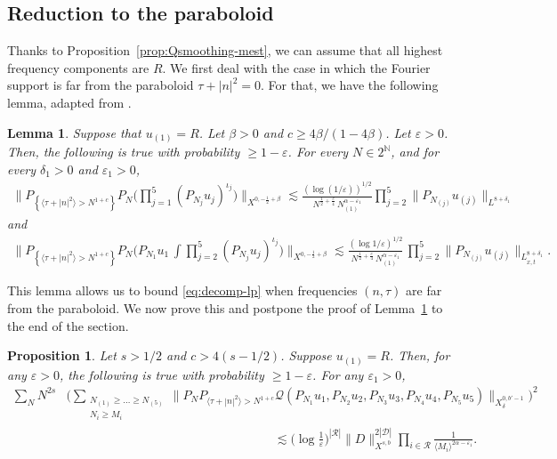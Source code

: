 \documentclass[11pt, xcolor = dvipsnames,reqno
]{amsart}
\newtheorem{prop}[thm]{Proposition}
\newtheorem{lem}[thm]{Lemma}
\theoremstyle{definition}
\theoremstyle{remark}
\begin{document}
\subsection{Reduction to the paraboloid} \label{subsec:red-par} 
Thanks to Proposition~\ref{prop:Qsmoothing-mest}, we can assume that all highest frequency components are $R$. 
%
We first deal with the case in which the Fourier support is far from the paraboloid $\tau + |n|^2 = 0$. 
For that, we have the following lemma, adapted from \cite{CLS2020}. 
\begin{lem}\label{lemma:reduction-2}
Suppose that $u_{(1)} = R$.
Let $\beta > 0$ and $c \geq 4\beta/(1 - 4\beta)$. 
Let $\varepsilon > 0$. 
Then, the following is true with probability $\geq 1 - \varepsilon$. 
For every $N \in 2^{\mathbb N}$, and for every $\delta_1 > 0$ and $\varepsilon_1 > 0$,
\begin{align}
\Big\| 
P_{\left\{ \langle \tau + |n|^2 \rangle > N^{1+c} \right\}} 
P_N  
\Big( 
\prod_{j=1}^5
(P_{N_j} u_j)^{\iota_j}
\Big) 
\Big\|_{X^{0,-\frac{1}{2}+\beta}}
\lesssim 
\frac{(\log (1/\varepsilon))^{1/2}}{N^{\frac{1}{2}+\frac{c}{4}} \, N_{(1)}^{\alpha - \varepsilon_1}} 
\prod_{j=2}^5 \lVert P_{N_{(j)}} u_{(j)} \rVert_{L^{8+\delta_1}}
\end{align}
and 
\begin{align}
    \bigg\| 
    P_{\left\{ \langle \tau + |n|^2 \rangle > N^{1+c} \right\}} 
    P_N  
    \Big( 
    P_{N_1} u_1 \, 
    \int 
    \prod_{j=2}^5
    (P_{N_j} u_j)^{\iota_j}
    \Big) 
    \bigg\|_{X^{0,-\frac{1}{2}+\beta}}
    \lesssim 
    \frac{(\log 1/\varepsilon)^{1/2}}{N^{\frac12 + \frac{c}{4}} \, N_{(1)}^{\alpha - \varepsilon_1}} \, 
    \prod_{j=2}^5
    \lVert P_{N_{(j)}} u_{(j)}
    \rVert_{L^{8+\delta_1}_{x,t}}.
\end{align}
\end{lem}

This lemma allows us to bound \eqref{eq:decomp-lp} when frequencies $(n,\tau)$ are far from the paraboloid.
We now prove this and postpone the proof of Lemma~\ref{lemma:reduction-2} to the end of the section.

\begin{prop}\label{prop:Qsmoothing-par}
    Let $s > 1/2$ and $c > 4(s - 1/2)$.
    Suppose $u_{(1)} = R$. 
    Then, for any $\varepsilon > 0$,
    the following is true with probability $\geq 1 - \varepsilon$. 
    For any $\varepsilon_1 > 0$, 
    \begin{align*}
        \sum_N
    N^{2s} 
    &\Big( 
    \sum_{\substack{N_{(1)} \geq \ldots\geq N_{(5)} \\ N_i \geq M_i  }} \lVert P_N P_{\langle \tau + |n|^2 \rangle > N^{1 + c}} \mathcal{Q}(P_{N_{1}}u_{1}, P_{N_{2}}u_{2}, P_{N_{3}}u_{3}, P_{N_{4}}u_{4}, P_{N_{5}}u_{5}) \rVert_{X^{0,b'-1}_\delta} \Big)^2 \\
    & \hspace{7cm} \lesssim \Big(  \log \frac{1}{\varepsilon} \Big)^{|\mathcal{R}|} \|D\|_{X^{s,b}}^{2|\mathcal{D}|} \prod_{i \in \mathcal{R}} \frac{1}{\langle M_i \rangle^{2\alpha - \varepsilon_1}}.
    \end{align*}
\end{prop}
\end{document}
